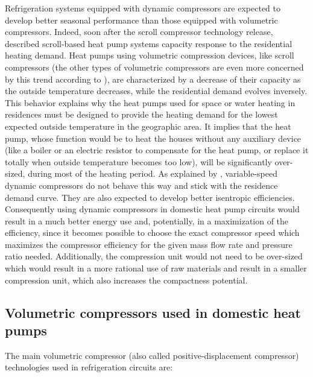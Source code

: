 Refrigeration systems equipped with dynamic compressors are expected
to develop better seasonal performance than those equipped with
volumetric compressors. Indeed, soon after the scroll compressor
technology release, \citet{Purvis-1987a} described scroll-based heat
pump systems capacity response to the residential heating demand. Heat
pumps using volumetric compression devices, like scroll compressors
(the other types of volumetric compressors are even more concerned by
this trend according to \citet{ASHRAE-HVACeq-2008a-Compressor}), are
characterized by a decrease of their capacity as the outside
temperature decreases, while the residential demand evolves
inversely. This behavior explains why the heat pumps used for space or
water heating in residences must be designed to provide the heating
demand for the lowest expected outside temperature in the geographic
area. It implies that the heat pump, whose function would be to heat
the houses without any auxiliary device (like a boiler or an electric
resistor to compensate for the heat pump, or replace it totally when
outside temperature becomes too low), will be significantly
over-sized, during most of the heating period. As explained by
\citet[p.\,1922]{Schiffmann-Favrat-2009a}, variable-speed dynamic
compressors do not behave this way and stick with the residence demand
curve. They are also expected to develop better isentropic
efficiencies. Consequently using
dynamic compressors in domestic heat pump circuits would result in a
much better energy use and, potentially, in a maximization of the
efficiency, since it becomes possible to choose the exact compressor
speed which maximizes the compressor efficiency for the given mass
flow rate and pressure ratio needed. Additionally, the compression
unit would not need to be over-sized which would result in a more
rational use of raw materials and result in a smaller compression
unit, which also increases the compactness potential.

\subsection{Volumetric compressors used in domestic
  heat pumps}
\label{sec:sota-vol-cp}

The main volumetric compressor (also called positive-displacement
compressor) technologies used in refrigeration circuits are:

